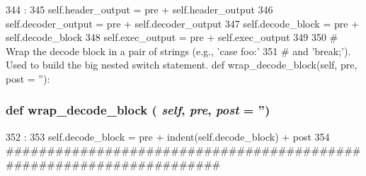 \begin{DoxyCode}
344                               :
345         self.header_output = pre + self.header_output
346         self.decoder_output  = pre + self.decoder_output
347         self.decode_block = pre + self.decode_block
348         self.exec_output  = pre + self.exec_output
349 
350     # Wrap the decode block in a pair of strings (e.g., 'case foo:'
351     # and 'break;').  Used to build the big nested switch statement.
    def wrap_decode_block(self, pre, post = ''):
\end{DoxyCode}
\hypertarget{classisa__parser_1_1GenCode_a503ce91498f135d34c2ead9c4a370b65}{
\subsubsection[{wrap\_\-decode\_\-block}]{\setlength{\rightskip}{0pt plus 5cm}def wrap\_\-decode\_\-block ( {\em self}, \/   {\em pre}, \/   {\em post} = {\ttfamily ''})}}
\label{classisa__parser_1_1GenCode_a503ce91498f135d34c2ead9c4a370b65}



\begin{DoxyCode}
352                                                :
353         self.decode_block = pre + indent(self.decode_block) + post
354 
#####################################################################
\end{DoxyCode}


